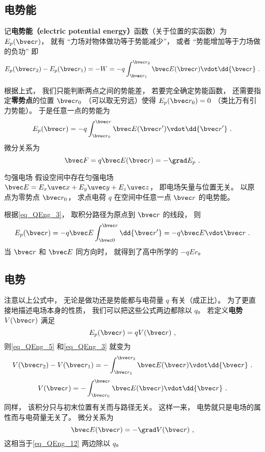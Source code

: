 \subsection{电势能}
记\textbf{电势能（electric potential energy）}函数（关于位置的实函数）为 $E_p(\bvec r)$， 就有 “力场对物体做功等于势能减少”， 或者 “势能增加等于力场做的负功” 即
\begin{equation}\label{eq_QEng_5}
E_p(\bvec r_2) - E_p(\bvec r_1) = -W = -q \int_{\bvec r_1}^{\bvec r_2} \bvec E(\bvec r) \vdot \dd{\bvec r}~.
\end{equation}

根据上式， 我们只能判断两点之间的势能差， 若要完全确定势能函数， 还需要指定\textbf{零势点}的位置 $\bvec r_0$ （可以取无穷远）使得 $E_p(\bvec r_0) = 0$ （类比万有引力势能）。 于是任意一点的势能为
\begin{equation}\label{eq_QEng_3}
E_p(\bvec r) = -q \int_{\bvec r_0}^{\bvec r} \bvec E(\bvec r') \vdot \dd{\bvec r'}~.
\end{equation}
微分关系为
\begin{equation}\label{eq_QEng_12}
\bvec F = q\bvec E(\bvec r) = -\grad E_p~.
\end{equation}

\begin{example}{匀强电场}
假设空间中存在匀强电场 $\bvec E = E_x \uvec x + E_y \uvec y + E_z \uvec z$， 即电场矢量与位置无关。 以原点为零势点 $\bvec r_0$， 求点电荷 $q$ 在空间中任意一点 $\bvec r$ 的电势能。

根据\autoref{eq_QEng_3}， 取积分路径为原点到 $\bvec r$ 的线段， 则
\begin{equation}
E_p(\bvec r) = -q \bvec E \int_{\bvec 0}^{\bvec r} \dd{\bvec r'} = -q \bvec E \vdot \bvec r~.
\end{equation}
当 $\bvec r$ 和 $\bvec E$ 同方向时， 就得到了高中所学的 $-qEr$。
\end{example}

\subsection{电势}
注意以上公式中， 无论是做功还是势能都与电荷量 $q$ 有关（成正比）。 为了更直接地描述电场本身的性质， 我们可以把这些公式两边都除以 $q$。 若定义\textbf{电势} $V(\bvec r)$ 满足
\begin{equation}\label{eq_QEng_14}
E_p(\bvec r) = q V(\bvec r)~,
\end{equation}
则\autoref{eq_QEng_5} 和\autoref{eq_QEng_3} 就变为
\begin{equation}\label{eq_QEng_1}
V(\bvec r_2) - V(\bvec r_1) = - \int_{\bvec r_1}^{\bvec r_2} \bvec E(\bvec r) \vdot \dd{\bvec r}~.
\end{equation}
\begin{equation}\label{eq_QEng_9}
V(\bvec r) = -\int_{\bvec r_0}^{\bvec r} \bvec E(\bvec r) \vdot \dd{\bvec r}~.
\end{equation}
同样， 该积分只与初末位置有关而与路径无关。 这样一来， 电势就只是电场的属性而与电荷量无关了。 微分关系为
\begin{equation}\label{eq_QEng_13}
\bvec E(\bvec r) = -\grad V(\bvec r)~,
\end{equation}
这相当于\autoref{eq_QEng_12} 两边除以 $q$。

